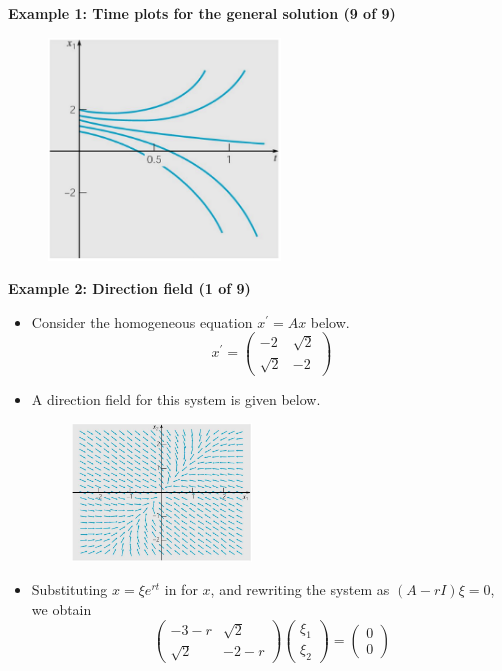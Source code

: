 \documentclass[11pt,a4paper]{article}
\begin{document}
	\textbf{Example 1: Time plots for the general solution (9 of 9)}
	\begin{figure}[H]
		\centering
			\includegraphics[width=0.55\textwidth]{figure/Lec12f3.PNG}
	\end{figure}
	\textbf{Example 2: Direction field (1 of 9)}
	\begin{itemize}
		\item Consider the homogeneous equation $x^\prime = Ax$ below.
		$$
		x^\prime =
		\begin{pmatrix}
			-2 & \sqrt{2}\\
			\sqrt{2} & -2
		\end{pmatrix}
		$$
		\item A direction field for this system is given below.
		\begin{figure}[H]
			\centering
				\includegraphics[width=0.45\textwidth]{figure/Lec12f4.PNG}
		\end{figure}
		\item Substituting $x = \xi e^{rt}$ in for $x$, and rewriting the system as $(A-rI)\xi = 0$, we obtain
		$$
		\begin{pmatrix}
			-3-r & \sqrt{2}\\
			\sqrt{2} & -2-r
		\end{pmatrix}
		\begin{pmatrix}
			\xi_1\\
			\xi_2
		\end{pmatrix}=
		\begin{pmatrix}
			0\\
			0
		\end{pmatrix}
		$$ 
	\end{itemize}
\end{document}
